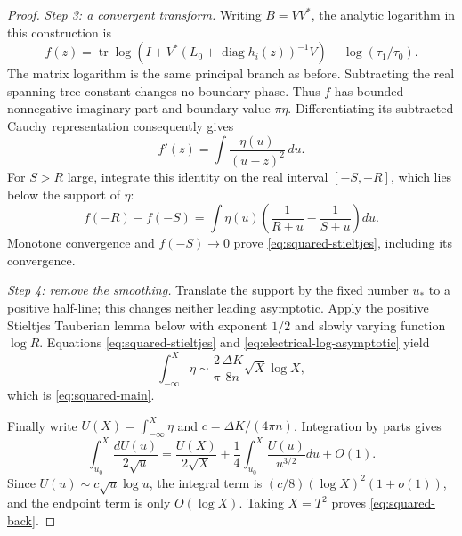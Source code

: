 \begin{proof}
\emph{Step 3: a convergent transform.}
Writing $B=VV^*$, the analytic logarithm in this construction is
\[
 f(z)=\operatorname{tr}\log\!\left(
 I+V^*(L_0+\operatorname{diag}h_i(z))^{-1}V\right)
                         -\log(\tau_1/\tau_0).
\]
The matrix logarithm is the same principal branch as before.  Subtracting
the real spanning-tree constant changes no boundary phase.  Thus $f$ has
bounded nonnegative imaginary part and
boundary value $\pi\eta$.  Differentiating its subtracted Cauchy representation consequently gives
\[
 f'(z)=\int\frac{\eta(u)}{(u-z)^2}\,du.
\]
For $S>R$ large, integrate this identity on the real interval
$[-S,-R]$, which lies below the support of $\eta$:
\[
 f(-R)-f(-S)
  =\int\eta(u)\left(\frac1{R+u}-\frac1{S+u}\right)du.
\]
Monotone convergence and $f(-S)\to0$ prove
\eqref{eq:squared-stieltjes}, including its convergence.

\emph{Step 4: remove the smoothing.}
Translate the support by the fixed number $u_*$ to a positive half-line;
this changes neither leading asymptotic.  Apply the positive Stieltjes
Tauberian lemma below with exponent $1/2$ and slowly varying function
$\log R$.  Equations \eqref{eq:squared-stieltjes} and
\eqref{eq:electrical-log-asymptotic} yield
\[
 \int_{-\infty}^{X}\eta
    \sim\frac{2}{\pi}\frac{\Delta K}{8n}\sqrt X\log X,
\]
which is \eqref{eq:squared-main}.

Finally write $U(X)=\int_{-\infty}^{X}\eta$ and
$c=\Delta K/(4\pi n)$.  Integration by parts gives
\[
 \int_{u_0}^{X}\frac{dU(u)}{2\sqrt u}
 =\frac{U(X)}{2\sqrt X}+\frac14\int_{u_0}^{X}\frac{U(u)}{u^{3/2}}du+O(1).
\]
Since $U(u)\sim c\sqrt u\log u$, the integral term is
$(c/8)(\log X)^2(1+o(1))$, and the endpoint term is only $O(\log X)$.
Taking $X=T^2$ proves \eqref{eq:squared-back}.
\end{proof}

